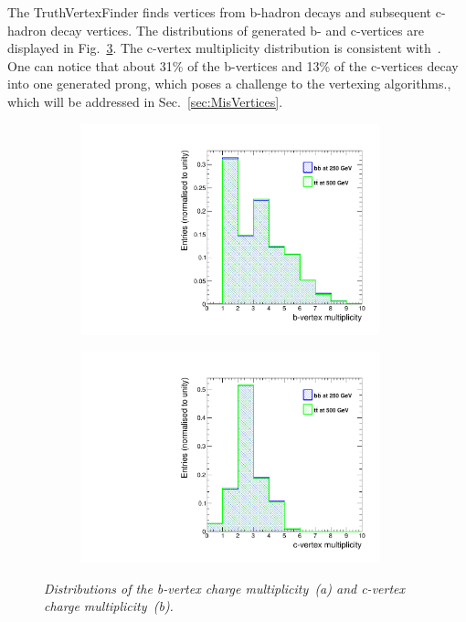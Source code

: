 The TruthVertexFinder finds vertices from b-hadron decays and subsequent c-hadron decay vertices. The distributions of generated b- and c-vertices are displayed in Fig.~\ref{fig:GenVtx_3}. The c-vertex multiplicity distribution is consistent with~\cite{bib:PDG}. One can notice that about 31\% of the b-vertices and 13\% of the c-vertices decay into one generated prong, which poses a challenge to the vertexing algorithms., which will be addressed in Sec.~\ref{sec:MisVertices}.

\begin{figure}[h]
\centering
\begin{subfigure}{0.5\textwidth}
    \includegraphics[width=0.95\textwidth]{ILD/plots/gen-b-vtx.pdf}
\caption{\label{fig:GenVtx_a_3} }
\end{subfigure}%
  \begin{subfigure}{0.5\textwidth}
\centering
    \includegraphics[width=0.95\textwidth]{ILD/plots/gen-c-vtx.pdf}
\caption{\label{fig:GenVtx_b_3} }
\end{subfigure}
    \caption{\sl Distributions of the b-vertex charge multiplicity~(a) and c-vertex charge multiplicity~(b). }
    \label{fig:GenVtx_3}
\end{figure}

